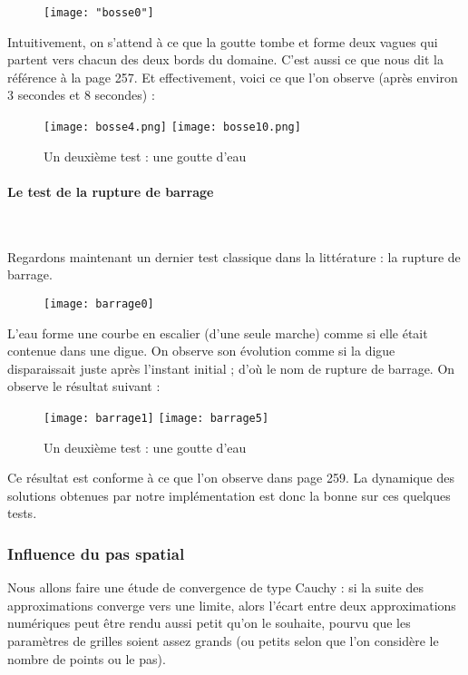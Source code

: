 \documentclass[
11pt, %
francais, %
singlespacing, %
headsepline, %
]{MastersDoctoralThesis} %
\theoremstyle{definition}
\begin{document}
\begin{figure}
\centering
\texttt{[image: "bosse0"]}
\end{figure}

Intuitivement, on s'attend à ce que la \og goutte \fg{} tombe et forme deux vagues qui partent vers chacun des deux bords du domaine.
C'est aussi ce que nous dit la référence \cite{RL} à la page 257. Et effectivement, voici ce que l'on observe (après environ 3 secondes et 8 secondes) :

\begin{figure}
\texttt{[image: bosse4.png]}
\texttt{[image: bosse10.png]} 
\caption{Un deuxième test : une goutte d'eau}
\end{figure}

\paragraph{Le test de la rupture de barrage} \

Regardons maintenant un dernier test classique dans la littérature : la rupture de barrage.

\begin{figure}
\centering
\texttt{[image: barrage0]}
\end{figure}

L'eau forme une courbe en escalier (d'une seule marche) comme si elle était contenue dans une digue. On observe son évolution comme si la digue disparaissait juste après l'instant initial ; d'où le nom de
rupture de barrage. On observe le résultat suivant :

\begin{figure}
\texttt{[image: barrage1]}
\texttt{[image: barrage5]} 
\caption{Un deuxième test : une goutte d'eau}
\end{figure}

Ce résultat est conforme à ce que l'on observe dans \cite{RL} page 259. La dynamique des solutions obtenues par notre implémentation est donc la bonne sur ces quelques tests.

\subsubsection{Influence du pas spatial}

Nous allons faire une étude de convergence de type Cauchy : si la suite des approximations converge vers une limite, alors l'écart entre deux approximations numériques peut être rendu aussi petit qu'on le souhaite, pourvu que les paramètres de grilles soient assez grands (ou petits selon que l'on considère le nombre de points ou le pas).
\end{document}

